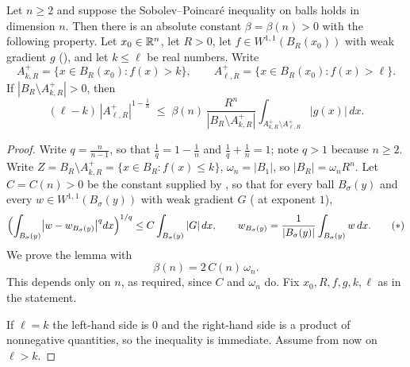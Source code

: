 \begin{lemma}[Lemma 2.2]
Let $n\ge2$ and suppose the Sobolev--Poincar\'e inequality on balls
 holds in dimension $n$.  Then there is an
absolute constant $\beta=\beta(n)>0$ with the following property.  Let
$x_0\in\mathbb{R}^n$, let $R>0$, let $f\in W^{1,1}(B_R(x_0))$ with weak gradient $g$
(), and let $k\le\ell$ be real numbers.  Write
\[
A^+_{k,R}=\{x\in B_R(x_0):f(x)>k\},\qquad
A^+_{\ell,R}=\{x\in B_R(x_0):f(x)>\ell\} .
\]
If $|B_R\setminus A^+_{k,R}|>0$, then
\[
(\ell-k)\,|A^+_{\ell,R}|^{1-\frac1n}
\;\le\;\beta(n)\,\frac{R^n}{|B_R\setminus A^+_{k,R}|}
\int_{A^+_{k,R}\setminus A^+_{\ell,R}}|g(x)|\,dx .
\]
\end{lemma}
\begin{proof}
Write $q=\frac n{n-1}$, so that $\frac1q=1-\frac1n$ and $\frac1q+\frac1n=1$; note
$q>1$ because $n\ge2$.  Write $Z=B_R\setminus A^+_{k,R}=\{x\in B_R:f(x)\le k\}$,
$\omega_n=|B_1|$, so $|B_R|=\omega_nR^n$.  Let $C=C(n)>0$ be the constant
supplied by , so that for every ball
$B_\sigma(y)$ and every $w\in W^{1,1}(B_\sigma(y))$ with weak gradient $G$
( at exponent $1$),
\[
\Bigl(\int_{B_\sigma(y)}\bigl|w-w_{B_\sigma(y)}\bigr|^{q}dx\Bigr)^{1/q}
\le C\int_{B_\sigma(y)}|G|\,dx ,
\qquad
w_{B_\sigma(y)}=\frac1{|B_\sigma(y)|}\int_{B_\sigma(y)}w\,dx .
\tag{$*$}
\]
We prove the lemma with
\[
\beta(n)=2\,C(n)\,\omega_n .
\]
This depends only on $n$, as required, since $C$ and $\omega_n$ do.  Fix
$x_0,R,f,g,k,\ell$ as in the statement.

If $\ell=k$ the left-hand side is $0$ and the right-hand side is a product of
nonnegative quantities, so the inequality is immediate.  Assume from now on
$\ell>k$.


\end{proof}
